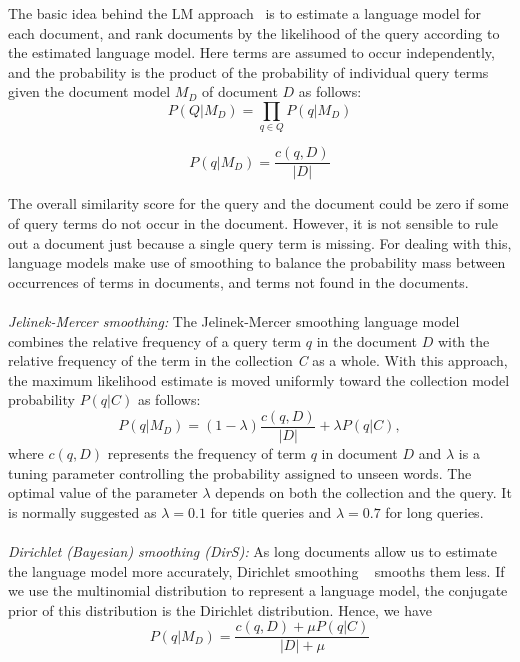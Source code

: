 The basic idea behind the LM approach~\citep{zhai2004study} is to estimate a language model for each document, and rank documents by the likelihood of the query according to the estimated language model. Here terms are assumed to occur independently, and the probability is the product of the probability of individual query terms given the document model $ M_{D} $ of document $ D $ as follows:
\begin{equation}
\label{eq:multinomial}
 P(Q|M_{D}) = \prod\limits_{q\in Q} P(q|M_{D}) 
\end{equation}

\begin{equation}
\label{eq:multinomial}
 P(q|M_{D}) = \frac{c(q,D)}{|D|}
\end{equation}

The overall similarity score for the query and the document could be zero if some of query terms do not occur in the document. However, it is not sensible to rule out a document just because a single query term is missing. For dealing with this, language models make use of smoothing to balance the probability mass between occurrences of terms in documents, and terms not found in the documents.
\\\\
\textit{Jelinek-Mercer smoothing:} The Jelinek-Mercer smoothing language model~\citep{zhai2004study} combines the relative frequency of a query term $q$ in the document $ D $ with the relative frequency of the term in the collection \textit{C} as a whole. With this approach, the maximum likelihood estimate is moved uniformly toward the collection model probability $ P(q|C) $ as follows:
\begin{equation}
P(q|M_{D}) = (1-\lambda)\frac{c(q,D)}{|D|}+\lambda P(q|C), 
\label{eq:jmsmoothing}
\end{equation} 
where $ c(q,D) $ represents the frequency of term $ q $ in document $ D $ and $ \lambda $ is a tuning parameter controlling the probability assigned to unseen words. The optimal value of the parameter $ \lambda $ depends on both the collection and the query. It is normally suggested as $ \lambda = 0.1$ for title queries and $ \lambda = 0.7$ for long queries.
\\\\
\textit{Dirichlet (Bayesian) smoothing (DirS):} As long documents allow us to estimate the language model more accurately, Dirichlet smoothing ~\citep{zhai2004study} smooths them less. If we use the multinomial distribution to represent a language model, the conjugate prior of this distribution is the Dirichlet distribution. Hence, we have
\begin{equation}
\label{eq:bayessmoothing}
 P(q|M_{D}) = \frac{c(q,D) + \mu P(q|C)}{|D| + \mu}
\end{equation} 

